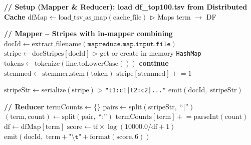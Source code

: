 \documentclass[12pt,a4paper]{article}
\begin{document}
\begin{algorithm}[H]
\caption{TF-IDF Score -- Stripes MapReduce}
\begin{algorithmic}[1]
\State \textbf{// Setup (Mapper \& Reducer): load df\_top100.tsv from Distributed Cache}
    \State $\text{dfMap} \leftarrow \text{load\_tsv\_as\_map}(\text{cache\_file})$
    \hfill \(\triangleright\) Maps term $\to$ DF
\EndFunction

\State
\State \textbf{// Mapper -- Stripes with in-mapper combining}
    \State $\text{docId} \leftarrow \text{extract\_filename}(\texttt{mapreduce.map.input.file})$
    \State $\text{stripe} \leftarrow \text{docStripes}[\text{docId}]$
    \hfill \(\triangleright\) get or create in-memory \texttt{HashMap}
    \State $\text{tokens} \leftarrow \text{tokenize}(\text{line.toLowerCase}())$
         \textbf{continue} \EndIf
        \State $\text{stemmed} \leftarrow \text{stemmer.stem}(\text{token})$
            \State $\text{stripe}[\text{stemmed}] \mathrel{+}= 1$
        \EndIf
    \EndFor
\EndFunction

\State
{}
        \State $\text{stripeStr} \leftarrow \text{serialize}(\text{stripe})$
        \hfill \(\triangleright\) \texttt{"t1:c1|t2:c2|..."}
        \State $\text{emit}(\text{docId},\; \text{stripeStr})$
    \EndFor
\EndFunction

\State
\State \textbf{// Reducer}
    \State $\text{termCounts} \leftarrow \{\}$
        \State $\text{pairs} \leftarrow \text{split}(\text{stripeStr},\; \text{``|''})$
            \State $(\text{term}, \text{count}) \leftarrow \text{split}(\text{pair}, \; \text{``:''})$
            \State $\text{termCounts}[\text{term}] \mathrel{+}= \text{parseInt}(\text{count})$
        \EndFor
    \EndFor
        \State $\text{df} \leftarrow \text{dfMap}[\text{term}]$
        \State $\text{score} \leftarrow \text{tf} \times \log(10000.0 / \text{df} + 1)$
        \State $\text{emit}(\text{docId},\; \text{term} + \texttt{"\textbackslash t"} + \text{format}(\text{score}, 6))$
    \EndFor
\EndFunction
\end{algorithmic}
\end{algorithm}
\end{document}
